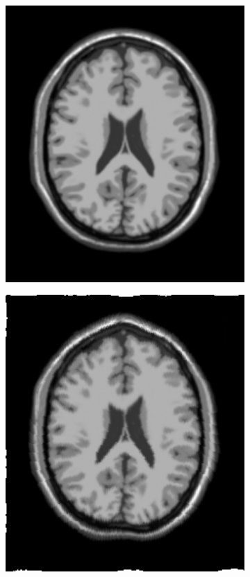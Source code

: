 \documentclass[t]{beamer}
\begin{document}
\begin{frame}
  \begin{figure}[H]
    \centering
    \begin{subfigure}[b]{0.49\textwidth}
      \includegraphics[width=1\textwidth]{figuras/screen.png}
    \end{subfigure}
    \begin{subfigure}[b]{0.49\textwidth}
      \includegraphics[width=1\textwidth]{figuras/resultSin.png}

\end{subfigure}
\end{figure}
\end{frame}
\end{document}
